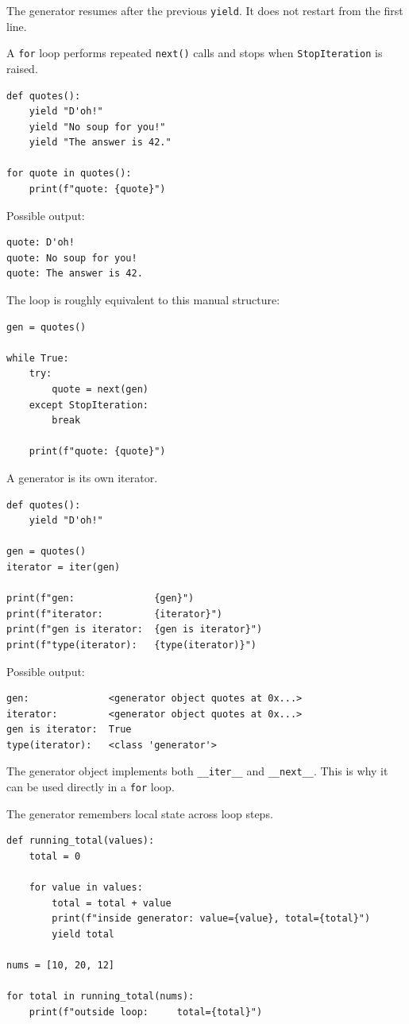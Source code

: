 The generator resumes after the previous \texttt{yield}. It does not restart from the first line.

A \texttt{for} loop performs repeated \texttt{next()} calls and stops when \texttt{StopIteration} is raised.

\begin{verbatim}
def quotes():
    yield "D'oh!"
    yield "No soup for you!"
    yield "The answer is 42."

for quote in quotes():
    print(f"quote: {quote}")
\end{verbatim}

Possible output:

\begin{verbatim}
quote: D'oh!
quote: No soup for you!
quote: The answer is 42.
\end{verbatim}

The loop is roughly equivalent to this manual structure:

\begin{verbatim}
gen = quotes()

while True:
    try:
        quote = next(gen)
    except StopIteration:
        break

    print(f"quote: {quote}")
\end{verbatim}

A generator is its own iterator.

\begin{verbatim}
def quotes():
    yield "D'oh!"

gen = quotes()
iterator = iter(gen)

print(f"gen:              {gen}")
print(f"iterator:         {iterator}")
print(f"gen is iterator:  {gen is iterator}")
print(f"type(iterator):   {type(iterator)}")
\end{verbatim}

Possible output:

\begin{verbatim}
gen:              <generator object quotes at 0x...>
iterator:         <generator object quotes at 0x...>
gen is iterator:  True
type(iterator):   <class 'generator'>
\end{verbatim}

The generator object implements both \texttt{\_\_iter\_\_} and \texttt{\_\_next\_\_}. This is why it can be used directly in a \texttt{for} loop.

The generator remembers local state across loop steps.

\begin{verbatim}
def running_total(values):
    total = 0

    for value in values:
        total = total + value
        print(f"inside generator: value={value}, total={total}")
        yield total

nums = [10, 20, 12]

for total in running_total(nums):
    print(f"outside loop:     total={total}")
\end{verbatim}

